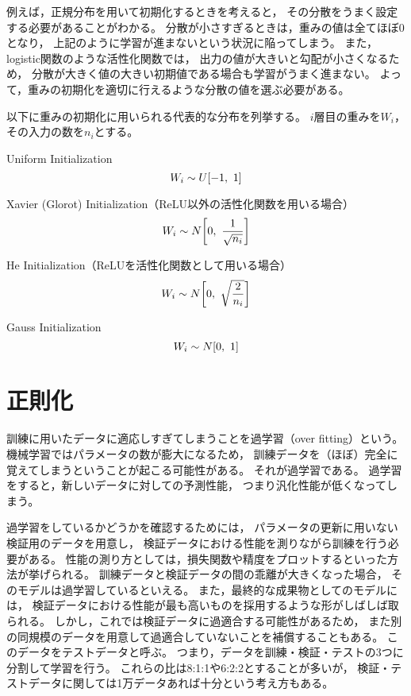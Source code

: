 \documentclass[class=jsarticle, crop=false, dvipdfmx, fleqn]{standalone}
\begin{document}
例えば，正規分布を用いて初期化するときを考えると，
その分散をうまく設定する必要があることがわかる。
分散が小さすぎるときは，重みの値は全てほぼ0となり，
上記のように学習が進まないという状況に陥ってしまう。
また，logistic関数のような活性化関数では，
出力の値が大きいと勾配が小さくなるため，
分散が大きく値の大きい初期値である場合も学習がうまく進まない。
よって，重みの初期化を適切に行えるような分散の値を選ぶ必要がある。

以下に重みの初期化に用いられる代表的な分布を列挙する。
$i$層目の重みを$W_i$，その入力の数を$n_i$とする。

Uniform Initialization
\begin{equation}
W_i \sim U\qty[-1,\ 1]
\end{equation}

Xavier (Glorot) Initialization（ReLU以外の活性化関数を用いる場合）
\begin{equation}
W_i \sim N\qty[0,\ \frac{1}{\sqrt{n_i}}]
\end{equation}

He Initialization（ReLUを活性化関数として用いる場合）
\begin{equation}
W_i \sim N\qty[0,\ \sqrt{\frac{2}{n_i}}]
\end{equation}

Gauss Initialization
\begin{equation}
W_i \sim N\qty[0,\ 1]
\end{equation}



\section{正則化}

訓練に用いたデータに適応しすぎてしまうことを過学習（over fitting）という。
機械学習ではパラメータの数が膨大になるため，
訓練データを（ほぼ）完全に覚えてしまうということが起こる可能性がある。
それが過学習である。
過学習をすると，新しいデータに対しての予測性能，
つまり汎化性能が低くなってしまう。

過学習をしているかどうかを確認するためには，
パラメータの更新に用いない検証用のデータを用意し，
検証データにおける性能を測りながら訓練を行う必要がある。
性能の測り方としては，損失関数や精度をプロットするといった方法が挙げられる。
訓練データと検証データの間の乖離が大きくなった場合，
そのモデルは過学習しているといえる。
また，最終的な成果物としてのモデルには，
検証データにおける性能が最も高いものを採用するような形がしばしば取られる。
しかし，これでは検証データに過適合する可能性があるため，
また別の同規模のデータを用意して過適合していないことを補償することもある。
このデータをテストデータと呼ぶ。
つまり，データを訓練・検証・テストの3つに分割して学習を行う。
これらの比は8:1:1や6:2:2とすることが多いが，
検証・テストデータに関しては1万データあれば十分という考え方もある。
\end{document}
